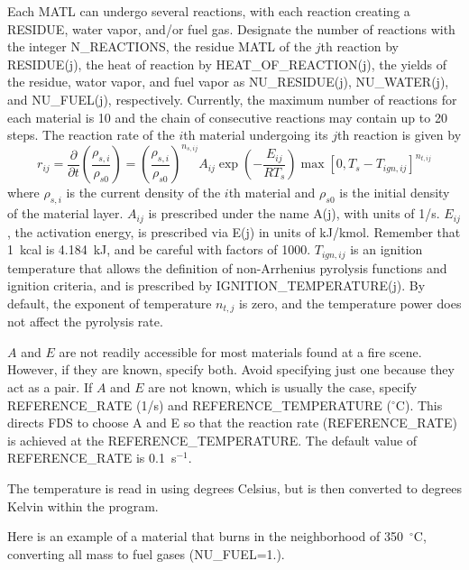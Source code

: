 \documentclass[11pt]{book}
\newcommand{\dod}[2]{\frac{\partial #1}{\partial #2}}
\newcommand{\be}{\begin{equation}}
\newcommand{\ee}{\end{equation}}
\begin{document}
Each {\ct MATL} can undergo several reactions, with each
reaction creating a {\ct RESIDUE}, water vapor, and/or fuel
gas. Designate the number of reactions with the integer {\ct
N\_REACTIONS}, the residue {\ct MATL} of the $j$th reaction by {\ct
RESIDUE(j)}, the heat of reaction by {\ct HEAT\_OF\_REACTION(j)}, the
yields of the residue, wator vapor, and fuel vapor as
{\ct NU\_RESIDUE(j)}, {\ct NU\_WATER(j)}, and {\ct NU\_FUEL(j)},
respectively. Currently, the maximum number of reactions for each
material is 10 and the chain of consecutive reactions may contain up
to 20 steps. The reaction rate of the $i$th material undergoing its
$j$th reaction is given by
\be
  r_{ij} =
  \dod{ }{t} \left( \frac{\rho_{s,i}}{\rho_{s0}} \right) =
  \left(\frac{\rho_{s,i}}{\rho_{s0}} \right)^{n_{s,ij}}
  A_{ij} \exp\left(-\frac{E_{ij}}{RT_s} \right)
  \max\left[0,T_s-T_{ign,ij}\right]^{n_{t,ij}}  \label{rr}
\ee
where $\rho_{s,i}$ is the current density of the $i$th material and
$\rho_{s0}$ is the initial density of the material layer.
$A_{ij}$ is prescribed under the name {\ct A(j)}, with units of
1/s. $E_{ij}$, the activation energy, is prescribed via {\ct E(j)} in
units of kJ/kmol. Remember that 1~kcal is 4.184~kJ, and be careful
with factors of 1000. $T_{ign,ij}$ is an ignition temperature that
allows the definition of non-Arrhenius pyrolysis functions and
ignition criteria, and is prescribed by {\ct IGNITION\_TEMPERATURE(j)}.
By default, the exponent of temperature $n_{t,j}$ is zero, and the
temperature power does not affect the pyrolysis rate.

$A$ and $E$ are not readily accessible for most materials found at a
fire scene. However, if they are known, specify both. Avoid specifying
just one because they act as a pair.  If $A$ and $E$ are not known,
which is usually the case, specify {\ct REFERENCE\_RATE} (1/s) and
{\ct REFERENCE\_TEMPERATURE} ($^\circ$C). This directs FDS to choose
{\ct A} and {\ct E} so that the reaction rate ({\ct REFERENCE\_RATE})
is achieved at the {\ct REFERENCE\_TEMPERATURE}. The default value of {\ct
REFERENCE\_RATE} is 0.1~s$^{-1}$.
\begin{warning}
\noindent
The temperature is read in using degrees Celsius, but is then converted to
degrees Kelvin within the program.
\end{warning}

Here is an example of a material that burns in the neighborhood of 350~$^\circ$C,
converting all mass to fuel gases ({\ct NU\_FUEL=1.}).
\end{document}
